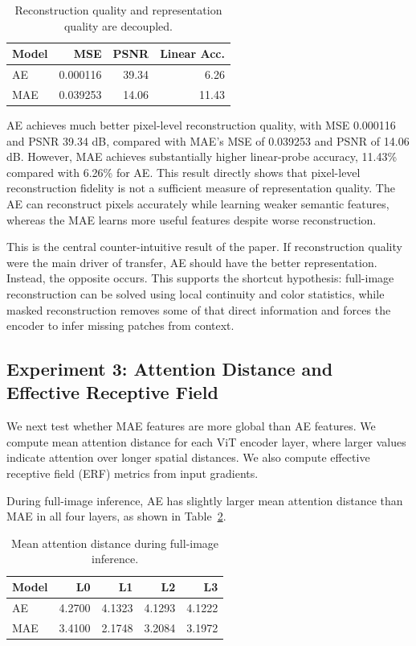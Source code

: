 \documentclass[10pt,twocolumn,letterpaper]{article}
\begin{document}
\begin{table}[t]
\centering
\caption{Reconstruction quality and representation quality are decoupled.}
\label{tab:exp2}
\begin{tabular}{lrrr}
\toprule
Model & MSE & PSNR & Linear Acc. \\
\midrule
AE  & 0.000116 & 39.34 & 6.26 \\
MAE & 0.039253 & 14.06 & 11.43 \\
\bottomrule
\end{tabular}
\end{table}

AE achieves much better pixel-level reconstruction quality, with MSE 0.000116 and PSNR 39.34 dB, compared with MAE's MSE of 0.039253 and PSNR of 14.06 dB. However, MAE achieves substantially higher linear-probe accuracy, 11.43\% compared with 6.26\% for AE. This result directly shows that pixel-level reconstruction fidelity is not a sufficient measure of representation quality. The AE can reconstruct pixels accurately while learning weaker semantic features, whereas the MAE learns more useful features despite worse reconstruction.

This is the central counter-intuitive result of the paper. If reconstruction quality were the main driver of transfer, AE should have the better representation. Instead, the opposite occurs. This supports the shortcut hypothesis: full-image reconstruction can be solved using local continuity and color statistics, while masked reconstruction removes some of that direct information and forces the encoder to infer missing patches from context.

\subsection{Experiment 3: Attention Distance and Effective Receptive Field}

We next test whether MAE features are more global than AE features. We compute mean attention distance for each ViT encoder layer, where larger values indicate attention over longer spatial distances. We also compute effective receptive field (ERF) metrics from input gradients.

During full-image inference, AE has slightly larger mean attention distance than MAE in all four layers, as shown in Table~\ref{tab:exp3_attention}.

\begin{table}[t]
\centering
\caption{Mean attention distance during full-image inference.}
\label{tab:exp3_attention}
\begin{tabular}{lrrrr}
\toprule
Model & L0 & L1 & L2 & L3 \\
\midrule
AE  & 4.2700 & 4.1323 & 4.1293 & 4.1222 \\
MAE & 3.4100 & 2.1748 & 3.2084 & 3.1972 \\
\bottomrule
\end{tabular}
\end{table}
\end{document}
